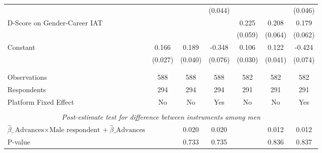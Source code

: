\begin{tabular}{l*{6}{c}}
                    &                     &                     &     (0.044)         &                     &                     &     (0.046)         \\
[1em]
D-Score on Gender-Career IAT&                     &                     &                     &       0.225\sym{***}&       0.208\sym{***}&       0.179\sym{***}\\
                    &                     &                     &                     &     (0.059)         &     (0.064)         &     (0.062)         \\
[1em]
Constant            &       0.166\sym{***}&       0.189\sym{***}&      -0.348\sym{***}&       0.106\sym{***}&       0.122\sym{***}&      -0.424\sym{***}\\
                    &     (0.027)         &     (0.040)         &     (0.076)         &     (0.030)         &     (0.041)         &     (0.074)         \\
\\[-1.8ex] \hline \\[-1.8ex]  
Observations        &         588         &         588         &         588         &         582         &         582         &         582         \\
Respondents         &         294         &         294         &         294         &         291         &         291         &         291         \\
Platform Fixed Effect&          No         &          No         &         Yes         &          No         &          No         &         Yes         \\
\hline \\[-1ex] \multicolumn{7}{c}{\textit{Post-estimate test for difference between instruments among men}} \\ $\hat\beta\_{\text{Advances} \times \text{Male respondent}} + \hat\beta\_{\text{Advances}}$&                     &       0.020         &       0.020         &                     &       0.012         &       0.012         \\
P-value             &                     &       0.733         &       0.735         &                     &       0.836         &       0.837         \\
\hline\hline \end{tabular}
